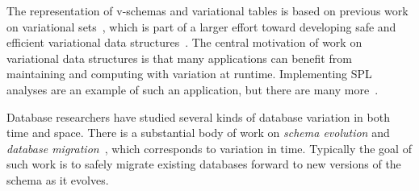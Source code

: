 %

The representation of v-schemas and variational tables is based on
previous work on variational sets~\cite{EWC13fosd}, which is part of a larger
effort toward developing safe and efficient variational data
structures~\cite{Walk14onward,MMWWK17vamos}. The central motivation of work on
variational data structures is that many applications can benefit from
maintaining and computing with variation at runtime. Implementing SPL analyses
are an example of such an application, but there are many
more~\cite{Walk14onward}.

Database researchers have studied several kinds of database variation in
both time and space. There is a substantial body of work on \emph{schema
evolution} and \emph{database
migration}~\cite{Prism08Curino,prima08Moon,schEvolUnifyApp,schEvolIssues03Ram},
which corresponds to variation in time. Typically the goal of such work is to
safely migrate existing databases forward to new versions of the schema as it
evolves. 

